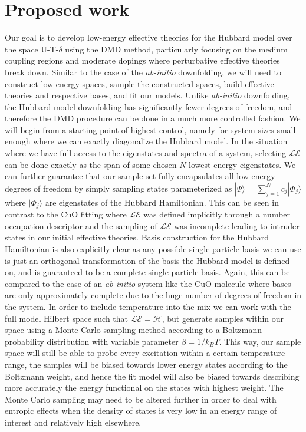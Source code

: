\documentclass[12pt]{article}
\begin{document}
\section{Proposed work}
Our goal is to develop low-energy effective theories for the
Hubbard model over the space U-T-$\delta$ using the DMD method, particularly focusing on the medium coupling regions and moderate dopings where perturbative effective theories break down.
Similar to the case of the \textit{ab-initio} downfolding, we will need to construct low-energy spaces, sample the constructed spaces, build effective theories and respective bases, and fit our models.
Unlike \textit{ab-initio} downfolding, the Hubbard model downfolding has significantly fewer degrees of freedom, and therefore the DMD procedure can be done in a much more controlled fashion.
We will begin from a starting point of highest control, namely for system sizes small enough where we can exactly diagonalize the Hubbard model.
In the situation where we have full access to the eigenstates and spectra of a system, selecting $\mathcal{LE}$ can be done exactly as the span of some chosen $N$ lowest energy eigenstates. 
We can further guarantee that our sample set fully encapsulates all low-energy degrees of freedom by simply sampling states parameterized as $|\Psi\rangle = \sum_{j=1}^N c_j |\Phi_j\rangle$ where $|\Phi_j\rangle$ are eigenstates of the Hubbard Hamiltonian.
This can be seen in contrast to the CuO fitting where $\mathcal{LE}$ was defined implicitly through a number occupation descriptor and the sampling of $\mathcal{LE}$ was incomplete leading to intruder states in our initial effective theories.
Basis construction for the Hubbard Hamiltonian is also explicitly clear as any possible single particle basis we can use is just an orthogonal transformation of the basis the Hubbard model is defined on, and is guaranteed to be a complete single particle basis.
Again, this can be compared to the case of an \textit{ab-initio} system like the CuO molecule where bases are only approximately complete due to the huge number of degrees of freedom in the system.
In order to include temperature into the mix we can work with the full model Hilbert space such that $\mathcal{LE} = \mathcal{H}$, but generate samples within our space using a Monte Carlo sampling method according to a Boltzmann probability distribution with variable parameter $\beta = 1/k_BT$.
This way, our sample space will still be able to probe every excitation within a certain temperature range, the samples will be biased towards lower energy states according to the Boltzmann weight, and hence the fit model will also be biased towards describing more accurately the energy functional on the states with highest weight.
The Monte Carlo sampling may need to be altered further in order to deal with entropic effects when the density of states is very low in an energy range of interest and relatively high elsewhere. 
\end{document}
